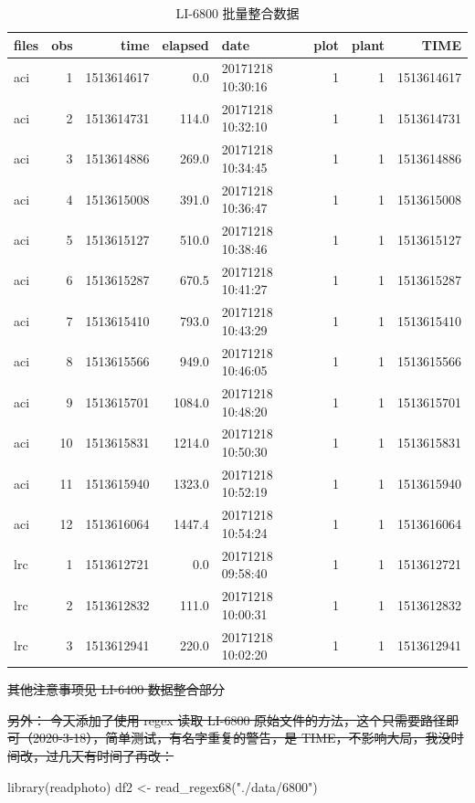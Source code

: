 \documentclass[
]{krantz}
\makeatletter
\newenvironment{Shaded}{\begin{snugshade}}{\end{snugshade}}
\newcommand{\FunctionTok}[1]{\textcolor[rgb]{0.00,0.00,0.00}{#1}}
\newcommand{\NormalTok}[1]{#1}
\newcommand{\OtherTok}[1]{\textcolor[rgb]{0.56,0.35,0.01}{#1}}
\newcommand{\StringTok}[1]{\textcolor[rgb]{0.31,0.60,0.02}{#1}}
\newenvironment{kframe}{%
\medskip{}
\setlength{\fboxsep}{.8em}
 \def\at@end@of@kframe{}%
 \ifinner\ifhmode%
  \def\at@end@of@kframe{\end{minipage}}%
  \begin{minipage}{\columnwidth}%
 \fi\fi%
 \def\FrameCommand##1{\hskip\@totalleftmargin \hskip-\fboxsep
 \colorbox{shadecolor}{##1}\hskip-\fboxsep
     \hskip-\linewidth \hskip-\@totalleftmargin \hskip\columnwidth}%
 \MakeFramed {\advance\hsize-\width
   \@totalleftmargin\z@ \linewidth\hsize
   \@setminipage}}%
 {\par\unskip\endMakeFramed%
 \at@end@of@kframe}
\renewenvironment{Shaded}{\begin{kframe}}{\end{kframe}}
\makeatother
\begin{document}
\begin{table}

\caption{\label{tab:unnamed-chunk-8}LI-6800 批量整合数据}
\centering
\begin{tabular}[t]{lrrrlrrr}
\toprule
files & obs & time & elapsed & date & plot & plant & TIME\\
\midrule
aci & 1 & 1513614617 & 0.0 & 20171218 10:30:16 & 1 & 1 & 1513614617\\
aci & 2 & 1513614731 & 114.0 & 20171218 10:32:10 & 1 & 1 & 1513614731\\
aci & 3 & 1513614886 & 269.0 & 20171218 10:34:45 & 1 & 1 & 1513614886\\
aci & 4 & 1513615008 & 391.0 & 20171218 10:36:47 & 1 & 1 & 1513615008\\
aci & 5 & 1513615127 & 510.0 & 20171218 10:38:46 & 1 & 1 & 1513615127\\
\addlinespace
aci & 6 & 1513615287 & 670.5 & 20171218 10:41:27 & 1 & 1 & 1513615287\\
aci & 7 & 1513615410 & 793.0 & 20171218 10:43:29 & 1 & 1 & 1513615410\\
aci & 8 & 1513615566 & 949.0 & 20171218 10:46:05 & 1 & 1 & 1513615566\\
aci & 9 & 1513615701 & 1084.0 & 20171218 10:48:20 & 1 & 1 & 1513615701\\
aci & 10 & 1513615831 & 1214.0 & 20171218 10:50:30 & 1 & 1 & 1513615831\\
\addlinespace
aci & 11 & 1513615940 & 1323.0 & 20171218 10:52:19 & 1 & 1 & 1513615940\\
aci & 12 & 1513616064 & 1447.4 & 20171218 10:54:24 & 1 & 1 & 1513616064\\
lrc & 1 & 1513612721 & 0.0 & 20171218 09:58:40 & 1 & 1 & 1513612721\\
lrc & 2 & 1513612832 & 111.0 & 20171218 10:00:31 & 1 & 1 & 1513612832\\
lrc & 3 & 1513612941 & 220.0 & 20171218 10:02:20 & 1 & 1 & 1513612941\\
\bottomrule
\end{tabular}
\end{table}

\sout{其他注意事项见 LI-6400 数据整合部分}

\sout{另外： 今天添加了使用 regex 读取 LI-6800 原始文件的方法，这个只需要路径即可（2020-3-18），简单测试，有名字重复的警告，是 TIME，不影响大局，我没时间改，过几天有时间了再改：}

\begin{Shaded}
\begin{Highlighting}[]
\FunctionTok{library}\NormalTok{(readphoto)}
\NormalTok{df2 }\OtherTok{\textless{}{-}} \FunctionTok{read\_regex68}\NormalTok{(}\StringTok{"./data/6800"}\NormalTok{)}
\end{Highlighting}
\end{Shaded}
\end{document}
